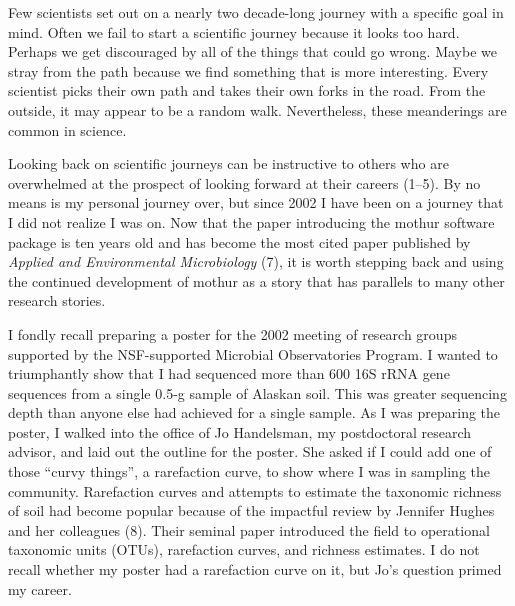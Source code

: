 \documentclass[11pt,]{article}
\begin{document}
\newpage

Few scientists set out on a nearly two decade-long journey with a
specific goal in mind. Often we fail to start a scientific journey
because it looks too hard. Perhaps we get discouraged by all of the
things that could go wrong. Maybe we stray from the path because we find
something that is more interesting. Every scientist picks their own path
and takes their own forks in the road. From the outside, it may appear
to be a random walk. Nevertheless, these meanderings are common in
science.

Looking back on scientific journeys can be instructive to others who are
overwhelmed at the prospect of looking forward at their careers (1--5).
By no means is my personal journey over, but since 2002 I have been on a
journey that I did not realize I was on. Now that the paper introducing
the mothur software package is ten years old and has become the most
cited paper published by \emph{Applied and Environmental Microbiology}
(7), it is worth stepping back and using the continued development of
mothur as a story that has parallels to many other research stories.

I fondly recall preparing a poster for the 2002 meeting of research
groups supported by the NSF-supported Microbial Observatories Program. I
wanted to triumphantly show that I had sequenced more than 600 16S rRNA
gene sequences from a single 0.5-g sample of Alaskan soil. This was
greater sequencing depth than anyone else had achieved for a single
sample. As I was preparing the poster, I walked into the office of Jo
Handelsman, my postdoctoral research advisor, and laid out the outline
for the poster. She asked if I could add one of those ``curvy things'',
a rarefaction curve, to show where I was in sampling the community.
Rarefaction curves and attempts to estimate the taxonomic richness of
soil had become popular because of the impactful review by Jennifer
Hughes and her colleagues (8). Their seminal paper introduced the field
to operational taxonomic units (OTUs), rarefaction curves, and richness
estimates. I do not recall whether my poster had a rarefaction curve on
it, but Jo's question primed my career.
\end{document}
